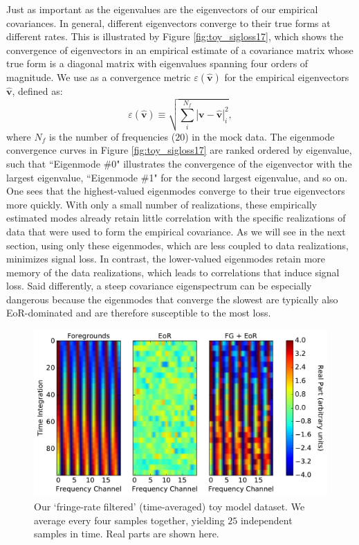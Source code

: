\documentclass[preprint2,numberedappendix,tighten]{aastex6}
\newcommand{\acl}[1]{{\color{red} \textbf{[ACL:  #1]}}}
\begin{document}
Just as important as the eigenvalues are the eigenvectors of our empirical covariances. In general, different eigenvectors converge to their true forms at different rates. This is illustrated by Figure \ref{fig:toy_sigloss17}, which shows the convergence of eigenvectors in an empirical estimate of a covariance matrix whose true form is a diagonal matrix with eigenvalues spanning four orders of magnitude. We use as a convergence metric $\varepsilon(\widehat{\textbf{v}})$ for the empirical eigenvectors $\widehat{\textbf{v}}$, defined as:
\begin{equation}
\label{eq:converge_eig}
\varepsilon (\widehat{\textbf{v}}) \equiv \sqrt{\sum_{i}^{N_{f}}|\textbf{v}-\widehat{\textbf{v}}|_{i}^2},
\end{equation}
where $N_{f}$ is the number of frequencies ($20$) in the mock data. The eigenmode convergence curves  in Figure \ref{fig:toy_sigloss17} are ranked ordered by eigenvalue, such that ``Eigenmode \#0" illustrates the convergence of the eigenvector with the largest eigenvalue, ``Eigenmode \#1" for the second largest eigenvalue, and so on. One sees that the highest-valued eigenmodes converge to their true eigenvectors more quickly. With only a small number of realizations, these empirically estimated modes already retain little correlation with the specific realizations of data that were used to form the empirical covariance. As we will see in the next section, using only these eigenmodes, which are less coupled to data realizations, minimizes signal loss. In contrast, the lower-valued eigenmodes retain more memory of the data realizations, which leads to correlations that induce signal loss. Said differently, a steep covariance eigenspectrum can be especially dangerous because the eigenmodes that converge the slowest are typically also EoR-dominated and are therefore susceptible to the most loss.  %

\begin{figure}
	\centering
	\includegraphics[width=\columnwidth]{plots/toy_sigloss5.pdf}
	\caption{Our `fringe-rate filtered' (time-averaged) toy model dataset. We average every four samples together, 
yielding $25$ independent samples in time. Real parts are shown here.}
	\label{fig:toy_sigloss5}
\end{figure}
\end{document}
